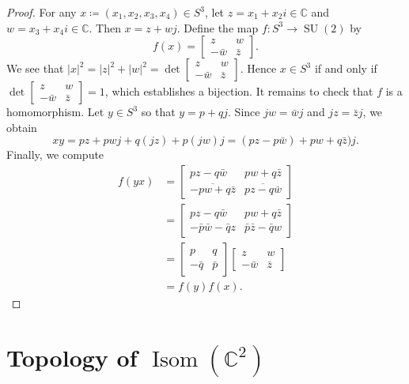 \documentclass[10pt,letterpaper,cm]{nupset}
\theoremstyle{definition}
\theoremstyle{theorem}
\theoremstyle{remark}
\newcommand{\C}{\mathbb C}
\newcommand{\1}{\mathbf{1}}
\newcommand{\0}{\vec {0}}
\DeclareMathOperator{\Isom}{Isom}
\DeclareMathOperator{\SU}{SU}
\begin{document}
\begin{proof}
For any $x\coloneqq \left(x_1, x_2, x_3, x_4\right) \in S^3$, let $z=x_1+x_2i\in \C$ and $w=x_3+x_4i\in \C$. Then $x=z+wj$. Define the map $f: S^3\to \SU(2)$ by $$f(x)= \begin{bmatrix} z & w\\ {-\bar{w}} & \bar{z} \end{bmatrix}.$$ We see that $|x|^2=|z|^2+|w|^2=\det{\begin{bmatrix} z & w\\ {-\bar{w}} & \bar{z} \end{bmatrix}}$. Hence $x\in S^3$ if and only if $\det{\begin{bmatrix} z & w\\ {-\bar{w}} & \bar{z} \end{bmatrix}}=1$, which establishes a bijection. It remains to check that $f$ is a homomorphism. Let $y\in S^3$ so that $y=p+qj$. Since $jw=\bar{w}j$ and $jz=\bar{z}j$, we obtain $$xy=pz+pwj+q(jz)+p(jw)j=(pz-p\bar{w})+pw+q\bar{z})j.$$ Finally, we compute 
\begin{align*}
f(yx)& =\begin{bmatrix} {pz-q\bar{w}}&  {pw+q\bar{z}} \\ \overline{-pw+q\bar{z}} & \overline{pz-q\bar{w}} \end{bmatrix}\\ & =\begin{bmatrix} {pz-q\bar{w}}&  {pw+q\bar{z}} \\ {-\bar{p}\bar{w}-\bar{q}{z}} & {\bar{p}\bar{z}-\bar{q}{w}} \end{bmatrix}\\ & =\begin{bmatrix} p & q \\ {-\bar{q}} & \bar{p}\end{bmatrix}\begin{bmatrix} z & w \\ {-\bar{w}} & \bar{z}\end{bmatrix}
\\ & =f(y)f(x).
\end{align*}
\end{proof}

\section{Topology of $\Isom(\C^2)$}
\end{document}
